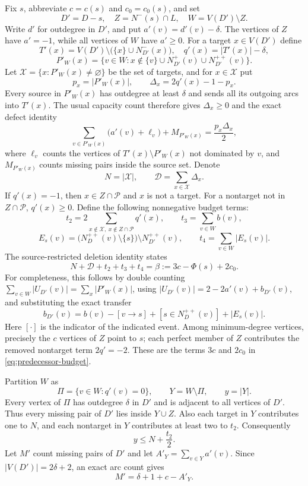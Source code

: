 Fix $s$, abbreviate $c=c(s)$ and $c_0=c_0(s)$, and set
\[
 D'=D-s,\quad Z=N^-(s)\cap L,\quad W=V(D')\setminus Z.
\]
Write $d'$ for outdegree in $D'$, and put $a'(v)=d'(v)-\delta$.
The vertices of $Z$ have $a'=-1$, while all vertices of $W$ have
$a'\ge0$.  For a target $x\in V(D')$ define
\[
 T'(x)=V(D')\setminus\bigl(\{x\}\cup N^-_{D'}(x)\bigr),\quad
 q'(x)=|T'(x)|-\delta,
\]
\[
 P'_W(x)=\{v\in W:x\notin\{v\}\cup N^+_{D'}(v)
                         \cup N^{++}_{D'}(v)\}.
\]
Let $\mathcal X=\{x:P'_W(x)\ne\varnothing\}$ be the set of targets,
and for $x\in\mathcal X$ put
\[
 p_x=|P'_W(x)|,\qquad \Delta_x=2q'(x)-1-p_x.
\]
Every source in $P'_W(x)$ has outdegree at least $\delta$ and sends
all its outgoing arcs into $T'(x)$.  The usual capacity count therefore
gives $\Delta_x\ge0$ and the exact defect identity
\begin{equation}\label{eq:restricted-local-defect}
 \sum_{v\in P'_W(x)}\bigl(a'(v)+\ell_v\bigr)+M_{P'_W(x)}
       =\frac{p_x\Delta_x}{2},
\end{equation}
where $\ell_v$ counts the vertices of $T'(x)\setminus P'_W(x)$ not
dominated by $v$, and $M_{P'_W(x)}$ counts missing pairs inside the
source set.  Denote
\[
 N=|\mathcal X|,\qquad \mathcal D=\sum_{x\in\mathcal X}\Delta_x.
\]
If $q'(x)=-1$, then $x\in Z\cap\mathcal P$ and $x$ is not a target.
For a nontarget not in $Z\cap\mathcal P$, $q'(x)\ge0$.
Define the following nonnegative budget terms:
\[
 t_2=2\!\sum_{x\notin\mathcal X,\ x\notin Z\cap\mathcal P}\!q'(x),
 \qquad t_3=\sum_{v\in W}b(v),
\]
\[
 E_s(v)=\bigl(N^{++}_D(v)\setminus\{s\}\bigr)
                    \setminus N^{++}_{D'}(v),\qquad
 t_4=\sum_{v\in W}|E_s(v)|.
\]
The source-restricted deletion identity states
\begin{equation}\label{eq:predecessor-budget}
 {N+\mathcal D+t_2+t_3+t_4
                =\beta:=3c-\Phi(s)+2c_0.}
\end{equation}
For completeness, this follows by double counting
$\sum_{v\in W}|U_{D'}(v)|=\sum_x|P'_W(x)|$, using
$|U_{D'}(v)|=2-2a'(v)+b_{D'}(v)$, and substituting the exact transfer
\[
 b_{D'}(v)=b(v)-[v\to s]+[s\in N^{++}_D(v)]+|E_s(v)|.
\]
Here $[\cdot]$ is the indicator of the indicated event.
Among minimum-degree vertices, precisely the $c$ vertices of $Z$
point to $s$; each perfect member of $Z$ contributes the removed
nontarget term $2q'=-2$.  These are the terms $3c$ and $2c_0$ in
\eqref{eq:predecessor-budget}.

Partition $W$ as
\[
 \Pi=\{v\in W:q'(v)=0\},\qquad Y=W\setminus\Pi,
 \qquad y=|Y|.
\]
Every vertex of $\Pi$ has outdegree $\delta$ in $D'$ and is adjacent
to all vertices of $D'$.  Thus every missing pair of $D'$ lies inside
$Y\cup Z$.  Also each target in $Y$ contributes one to $N$, and each
nontarget in $Y$ contributes at least two to $t_2$.  Consequently
\begin{equation}\label{eq:y-target-count}
 y\le N+\frac{t_2}{2}.
\end{equation}
Let $M'$ count missing pairs of $D'$ and let
$A'_Y=\sum_{v\in Y}a'(v)$.  Since $|V(D')|=2\delta+2$, an exact arc
count gives
\begin{equation}\label{eq:deleted-missing-exact}
 {M'=\delta+1+c-A'_Y.}
\end{equation}

